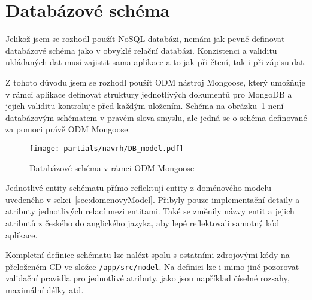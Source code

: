 
\section{Databázové schéma}\label{sec:databázovéSchéma}

Jelikož jsem se rozhodl použít \gls{NoSQL} databázi, nemám jak pevně definovat databázové schéma jako v obvyklé relační databázi.
Konzistenci a validitu ukládaných dat musí zajistit sama aplikace a to jak při čtení, tak i při zápisu dat.

Z tohoto důvodu jsem se rozhodl použít \gls{ODM} nástroj Mongoose, který umožňuje v rámci aplikace definovat struktury jednotlivých dokumentů pro MongoDB a jejich validitu kontroluje před každým uložením.
Schéma na obrázku~\ref{fig:DB_model} není databázovým schématem v pravém slova smyslu, ale jedná se o schéma definované za pomoci právě \gls{ODM} Mongoose.

\begin{figure}[ht!]
    \centering
    \texttt{[image: partials/navrh/DB\_model.pdf]}
    \caption{Databázové schéma v rámci ODM Mongoose}\label{fig:DB_model}
\end{figure}

Jednotlivé entity schématu přímo reflektují entity z doménového modelu uvedeného v sekci~\ref{sec:domenovyModel}.
Přibyly pouze implementační detaily a atributy jednotlivých relací mezi entitami.
Také se změnily názvy entit a jejich atributů z českého do anglického jazyka, aby lepé reflektovali samotný kód aplikace.

Kompletní definice schématu lze nalézt spolu s ostatními zdrojovými kódy na přeloženém CD ve složce \texttt{/app/src/model}.
Na definici lze i mimo jiné pozorovat validační pravidla pro jednotlivé atributy, jako jsou například číselné rozsahy, maximální délky atd.
